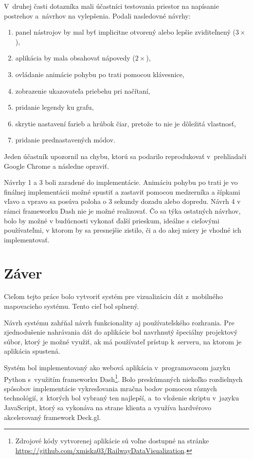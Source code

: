 V~druhej časti dotazníka mali účastníci testovania priestor na napísanie postrehov a~návrhov na vylepšenia. Podali nasledovné návrhy:
\begin{enumerate}
    \item panel nástrojov by mal byť implicitne otvorený alebo lepšie zviditeľnený ($3\times$),
    \item aplikácia by mala obsahovať nápovedy ($2\times$),
    \item ovládanie animácie pohybu po trati pomocou klávesnice,
    \item zobrazenie ukazovateľa priebehu pri načítaní,
    \item pridanie legendy ku grafu,
    \item skrytie nastavení farieb a hrúbok čiar, pretože to nie je dôležitá vlastnosť,
    \item pridanie prednastavených módov.
\end{enumerate}

Jeden účastník upozornil na chybu, ktorú sa podarilo reprodukovať v~prehliadači Google Chrome a následne opraviť.

Návrhy 1 a 3 boli zaradené do implementácie. Animáciu pohybu po trati je vo finálnej implementácii možné spustiť a zastaviť pomocou medzerníka a šípkami vľavo a vpravo sa posúva poloha o 3 sekundy dozadu alebo dopredu. Návrh 4 v rámci frameworku Dash nie je možné realizovať. Čo sa týka ostatných návrhov, bolo by možné v budúcnosti vykonať ďalší prieskum, ideálne s cieľovými používateľmi, v ktorom by sa presnejšie zistilo, či a do akej miery je vhodné ich implementovať.

\chapter{Záver}

Cieľom tejto práce bolo vytvoriť systém pre vizualizáciu dát z~mobilného mapovacieho systému. Tento cieľ bol splnený.

Návrh systému zahŕňal návrh funkcionality aj používateľského rozhrania. Pre zjednodušenie nahrávania dát do aplikácie bol navrhnutý špeciálny projektový súbor, ktorý je možné využiť, ak má používateľ prístup k~serveru, na ktorom je aplikácia spustená.

Systém bol implementovaný ako webová aplikácia v~programovacom jazyku Python s~využitím frameworku Dash\footnote{Zdrojové kódy vytvorenej aplikácie sú voľne dostupné na stránke \url{https://github.com/xmiska03/RailwayDataVisualization}.}. Bolo preskúmaných niekoľko rozdielnych spôsobov implementácie vykresľovania mračna bodov pomocou rôznych technológií, z~ktorých bol vybraný ten najlepší, a~to vloženie skriptu v~jazyku JavaScript, ktorý sa vykonáva na strane klienta a využíva hardvérovo akcelerovaný framework Deck.gl. 

